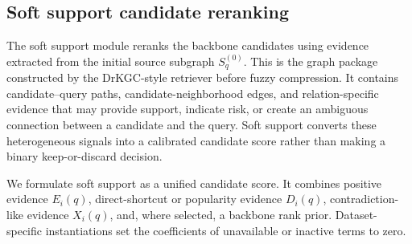 \documentclass[pdflatex,sn-mathphys-num]{sn-jnl}
\newcommand{\drkgc}{DrKGC}
\begin{document}
\subsection{Soft support candidate reranking}

The soft support module reranks the backbone candidates using evidence extracted from the initial source subgraph $S^{(0)}_q$. This is the graph package constructed by the \drkgc{}-style retriever before fuzzy compression. It contains candidate--query paths, candidate-neighborhood edges, and relation-specific evidence that may provide support, indicate risk, or create an ambiguous connection between a candidate and the query. Soft support converts these heterogeneous signals into a calibrated candidate score rather than making a binary keep-or-discard decision.

We formulate soft support as a unified candidate score. It combines positive evidence $E_i(q)$, direct-shortcut or popularity evidence $D_i(q)$, contradiction-like evidence $X_i(q)$, and, where selected, a backbone rank prior. Dataset-specific instantiations set the coefficients of unavailable or inactive terms to zero.
\end{document}
